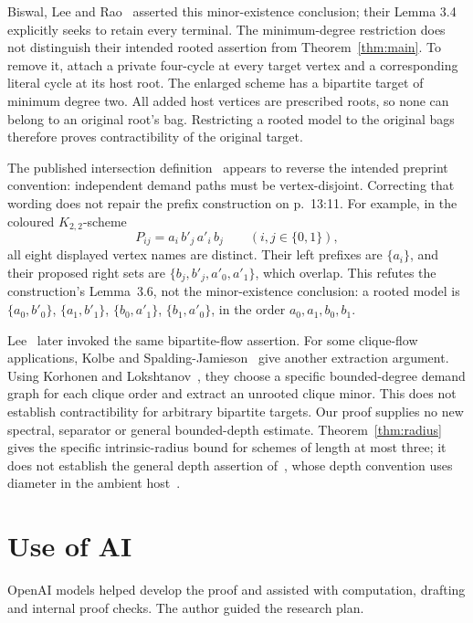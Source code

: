 \documentclass[11pt]{amsart}
\begin{document}
Biswal, Lee and Rao~\cite[Lemma 3.2]{BLR} asserted this minor-existence
conclusion; their Lemma 3.4 explicitly seeks to retain every terminal.
The minimum-degree restriction does not distinguish their intended
rooted assertion from Theorem~\ref{thm:main}. To remove it, attach a
private four-cycle at every target vertex and a corresponding literal
cycle at its host root. The enlarged scheme has a bipartite target of
minimum degree two. All added host vertices are prescribed roots, so
none can belong to an original root's bag. Restricting a rooted model
to the original bags therefore proves contractibility of the original
target.

The published intersection definition~\cite[p.~13:10]{BLR} appears to
reverse the intended preprint convention: independent demand paths
must be vertex-disjoint. Correcting that wording does not repair the
prefix construction on p.~13:11. For example, in the coloured
$K_{2,2}$-scheme
\[
 P_{ij}=a_i\,b'_j\,a'_i\,b_j\qquad(i,j\in\{0,1\}),
\]
all eight displayed vertex names are distinct. Their left prefixes are
$\{a_i\}$, and their proposed right sets are
$\{b_j,b'_j,a'_0,a'_1\}$, which overlap. This refutes the construction's
Lemma~3.6, not the minor-existence conclusion: a rooted model is
$\{a_0,b'_0\}$, $\{a_1,b'_1\}$, $\{b_0,a'_1\}$,
$\{b_1,a'_0\}$, in the order $a_0,a_1,b_0,b_1$.

Lee~\cite[Lemma 3.3]{Lee} later invoked the same bipartite-flow assertion.
For some clique-flow applications, Kolbe and
Spalding-Jamieson~\cite[Lemma 3.11 and Proposition 3.4]{KSJ} give another
extraction argument. Using Korhonen and
Lokshtanov~\cite[Lemmas 4.3--4.4]{KL}, they choose a specific bounded-degree
demand graph for each clique order and extract an unrooted clique minor.
This does not establish contractibility for
arbitrary bipartite targets. Our proof supplies no new spectral,
separator or general bounded-depth estimate. Theorem~\ref{thm:radius}
gives the specific intrinsic-radius bound for schemes of length at most
three; it does not establish the general depth assertion
of~\cite[Lemma 3.13]{BLR}, whose depth convention uses diameter in the
ambient host~\cite[Section 1.2.2]{BLR}.

\section*{Use of AI}
OpenAI models helped develop the proof and assisted with computation,
drafting and internal proof checks. The author guided the research plan.
\end{document}
